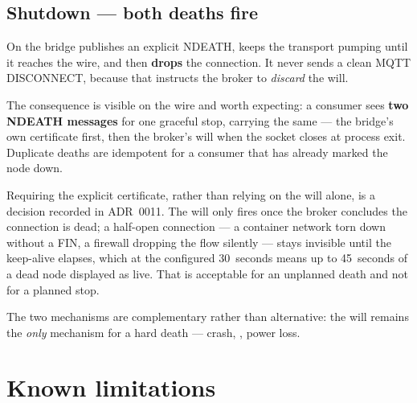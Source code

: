 \subsection{Shutdown --- both deaths fire}
\label{sec:contract-shutdown}

On  the bridge publishes an explicit NDEATH, keeps the transport pumping
until it reaches the wire, and then \textbf{drops} the connection. It never sends a clean
MQTT DISCONNECT, because that instructs the broker to \emph{discard} the will.

The consequence is visible on the wire and worth expecting: a consumer sees
\textbf{two NDEATH messages} for one graceful stop, carrying the same  ---
the bridge's own certificate first, then the broker's will when the socket closes at
process exit. Duplicate deaths are idempotent for a consumer that has already marked the
node down.

\begin{note}
Requiring the explicit certificate, rather than relying on the will alone, is a decision
recorded in ADR~0011. The will only fires once the broker concludes the connection is
dead; a half-open connection --- a container network torn down without a FIN, a firewall
dropping the flow silently --- stays invisible until the keep-alive elapses, which at the
configured 30~seconds means up to 45~seconds of a dead node displayed as live. That is
acceptable for an unplanned death and not for a planned stop.
\end{note}

The two mechanisms are complementary rather than alternative: the will remains the
\emph{only} mechanism for a hard death --- crash, , power loss.

\section{Known limitations}
\label{sec:contract-limits}

